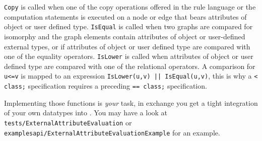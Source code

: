 \texttt{Copy} is called when one of the copy operations offered in the rule language or the computation statements is executed on a node or edge that bears attributes of object or user defined type.
\texttt{IsEqual} is called when two graphs are compared for isomorphy and the graph elements contain attributes of object or user-defined external types, or if attributes of object or user defined type are compared with one of the equality operators.
\texttt{IsLower} is called when attributes of object or user defined type are compared with one of the relational operators.
A comparison for \texttt{u<=v} is mapped to an expression \verb#IsLower(u,v) || IsEqual(u,v)#, this is why a \verb#< class;# specification requires a preceding \verb#== class;# specification.

Implementing those functions is \emph{your} task, in exchange you get a tight integration of your own datatypes into \GrG.
You may have a look at \texttt{tests/ExternalAttributeEvaluation} or  \texttt{examples\-api/ExternalAttributeEvaluationExample} for an example.

